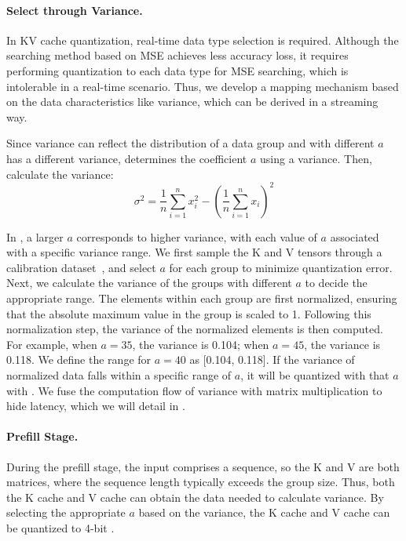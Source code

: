 \paragraph{Select \proj through Variance.}
In KV cache quantization, real-time data type selection is required.
Although the searching method based on MSE achieves less accuracy loss, it requires performing quantization to each data type for MSE searching, which is intolerable in a real-time scenario.
Thus, we develop a mapping mechanism based on the data characteristics like variance, which can be derived in a streaming way.

Since variance can reflect the distribution of a data group and \proj with different $a$ has a different variance, \proj determines the coefficient $a$ using a variance.
Then, calculate the variance:
\begin{equation}
    \sigma^2 = \frac{1}{n} \sum_{i=1}^{n} x_i^2 - \left( \frac{1}{n} \sum_{i=1}^{n} x_i \right)^2
    \label{eqn:variance}
\end{equation}

In \proj, a larger $a$ corresponds to higher variance, with each value of $a$ associated with a specific variance range.
We first sample the K and V tensors through a calibration dataset~\cite{gao2020pile}, and select $a$ for each group to minimize quantization error.
Next, we calculate the variance of the groups with different $a$ to decide the appropriate range.
The elements within each group are first normalized, ensuring that the absolute maximum value in the group is scaled to 1. 
Following this normalization step, the variance of the normalized elements is then computed.
For example, when $a=35$, the variance is 0.104; when $a=45$, the variance is 0.118.
We define the range for $a=40$ as [0.104, 0.118].
If the variance of normalized data falls within a specific range of $a$, it will be quantized with that $a$ with \proj.
We fuse the computation flow of variance with matrix multiplication to hide latency, which we will detail in .


\paragraph{Prefill Stage.}
During the prefill stage, the input comprises a sequence, so the K and V are both matrices, where the sequence length typically exceeds the group size.
Thus, both the K cache and V cache can obtain the data needed to calculate variance.
By selecting the appropriate $a$ based on the variance, the K cache and V cache can be quantized to 4-bit \proj.


